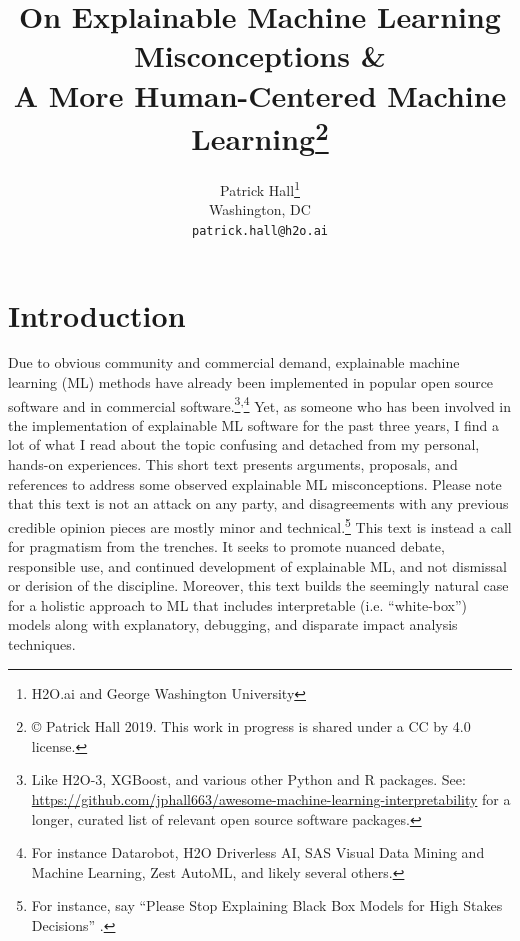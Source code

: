 \documentclass[fleqn]{article}
\title{On Explainable Machine Learning Misconceptions \&\\ A More Human-Centered Machine Learning\footnote{\copyright \hspace{1pt} Patrick Hall 2019. This work in progress is shared under a CC by 4.0 license.}}
\author{
  Patrick Hall\footnote{H2O.ai and George Washington University} \\
  Washington, DC\\
  \texttt{patrick.hall@h2o.ai}
}
\begin{document}
\maketitle

\section*{Introduction}

Due to obvious community and commercial demand, explainable machine learning (ML) methods have already been implemented in popular open source software and in commercial software.\footnote{Like H2O-3, XGBoost, and various other Python and R packages. See: \url{https://github.com/jphall663/awesome-machine-learning-interpretability} for a longer, curated list of relevant open source software packages.}\textsuperscript{,}\footnote{For instance  Datarobot, H2O Driverless AI, SAS Visual Data Mining and Machine Learning, Zest AutoML, and likely several others.} Yet, as someone who has been involved in the implementation of explainable ML software for the past three years, I find a lot of what I read about the topic confusing and detached from my personal, hands-on experiences. This short text presents arguments, proposals, and references to address some observed explainable ML misconceptions. Please note that this text is not an attack on any party, and disagreements with any previous credible opinion pieces are mostly minor and technical.\footnote{For instance, say ``Please Stop Explaining Black Box Models for High Stakes Decisions'' \cite{please_stop}.} This text is instead a call for pragmatism from the trenches. It seeks to promote nuanced debate, responsible use, and continued development of explainable ML, and not dismissal or derision of the discipline.  Moreover, this text builds the seemingly natural case for a holistic approach to ML that includes interpretable (i.e. ``white-box'') models along with explanatory, debugging, and disparate impact analysis techniques.\\
\end{document}
